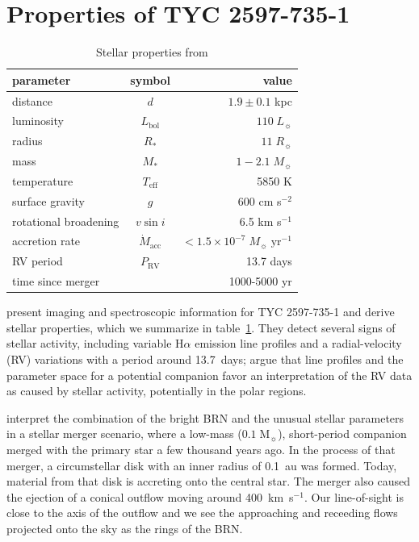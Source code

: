 \documentclass[]{aastex631}
\begin{document}
\section{Properties of TYC 2597-735-1}
\label{sec:properties}

\begin{table}
\caption{Stellar properties from \citet{2020Natur.587..387H} \label{tab:parameters}}
\begin{tabular}{lcr}
\hline \hline
parameter & symbol & value \\
\hline
distance & $d$ & $1.9 \pm 0.1$ kpc\\
luminosity & $L_\mathrm{bol}$ & $110 \;L_\sun{}$\\
radius & $R_*$ & $11\;R_\sun{}$\\
mass & $M_*$ & $1-2.1\;M_\sun{}$\\
temperature & $T_\mathrm{eff}$ & 5850 K\\
surface gravity & $g$ & 600 cm s$^{-2}$\\
rotational broadening & $v \sin i$ & 6.5 km s$^{-1}$\\
accretion rate & $\dot M_\mathrm{acc}$ & $<1.5 \times 10^{-7}\; M_\sun{}\;\mathrm{yr}^{-1}$\\
RV period & $P_\mathrm{RV}$ & 13.7 days \\
time since merger & & 1000-5000 yr\\
\hline
\end{tabular}
\end{table}

\cite{2020Natur.587..387H} present imaging and spectroscopic information for TYC 2597-735-1 and derive stellar properties, which we summarize in table~\ref{tab:parameters}. They detect several signs of stellar activity, including variable H$\alpha$ emission line profiles and a radial-velocity (RV)  variations with a period around 13.7~days; \cite{2020Natur.587..387H} argue that line profiles and the parameter space for a potential companion favor an interpretation of the RV data as caused by stellar activity, potentially in the polar regions.

\cite{2020Natur.587..387H} interpret the combination of the bright BRN and the unusual stellar parameters in a stellar merger scenario, where a low-mass ($0.1\;\mathrm{M}_\sun$), short-period companion merged with the primary star a few thousand years ago. In the process of that merger, a circumstellar disk with an inner radius of 0.1~au was formed. Today, material from that disk is accreting onto the central star. The merger also caused the ejection of a conical outflow moving around 400~km~s$^{-1}$. Our line-of-sight is close to the axis of the outflow and we see the approaching and receeding flows projected onto the sky as the rings of the BRN.
\end{document}
